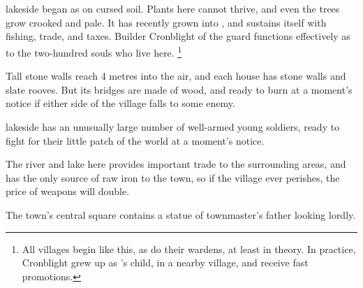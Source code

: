 

\section[\Glsfmttext{lakeside}]{~~}
\label{lakeside}

\begin{multicols}{2}

\begin{exampletext}
  \Gls{lakeside} began as  on cursed soil.
  Plants here cannot thrive, and even the trees grow crooked and pale.
  It has recently grown into , and sustains itself with fishing, trade, and taxes.
  Builder Cronblight of the \gls{guard} functions effectively as  to the two-hundred souls who live here.%
  \footnote{All \glspl{village} begin like this, as do their \glspl{warden}, at least in theory.
  In practice, Cronblight grew up as 's child, in a nearby \gls{village}, and receive fast promotions.}
\end{exampletext}

Tall stone walls reach 4 metres into the air, and each house has stone walls and slate rooves.
But its bridges are made of wood, and ready to burn at a moment's notice if either side of the \gls{village} falls to some enemy.

\Gls{lakeside} has an unusually large number of well-armed young soldiers, ready to fight for their little patch of the world at a moment's notice.

The river and lake here provides important trade to the surrounding areas, and has the only source of raw iron to the town, so if the \gls{village} ever perishes, the price of weapons will double.

\label{cronblight}



The town's central square contains a statue of \gls{townmaster}'s father looking lordly.



\end{multicols}
